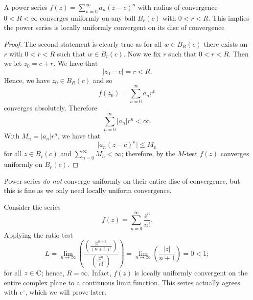 \begin{theorem}[]
    A power series $f(z) = \sum_{n = 0}^\infty a_n (z - c)^n$ with radius of convergence $0 < R < \infty$ converges uniformly on any ball $B_r(c)$ with $0 < r < R$.
    This implies the power series is locally uniformly convergent on its disc of convergence
\end{theorem}

\begin{proof}
    The second statement is clearly true as for all $w \in B_R(c)$ there exists an $r$ with $0 < r < R$ such that $w \in B_r(c)$. 
    Now we fix $r$ such that $0 < r < R$.
    Then we let $z_0 = c + r$.
    We have that 
    \[ \lvert z_0 - c \rvert = r < R. \]
    Hence, we have $z_0 \in B_R(c)$ and so 
    \[ f(z_0) = \sum_{n = 0}^\infty a_nr^n \] 
    converges absolutely.
    Therefore
    \[ \sum_{n = 0}^\infty \lvert a_n \rvert r^n < \infty. \]
    With $M_n = \lvert a_n \rvert r^n$, we have that
    \[ \lvert a_n (z - c)^n \rvert \leq M_n \]
    for all $z \in B_r(c)$ and $\sum_{n = 0}^\infty M_n < \infty$;
    therefore, by the $M$-test $f(z)$ converges uniformly on $B_r(c)$.
\end{proof}

\begin{remark}
    Power series \emph{do not} converge uniformly on their entire disc of convergence, but this is fine as we only need locally uniform convergence.
\end{remark}

\begin{example}
    Consider the series
    \[ f(z) = \sum_{n = 0}^\infty \frac{z^n}{n!}.\]
    Applying the ratio test
    \[ 
        L = \lim_{n \to \infty}
        \left( 
            \frac{\left(\frac{\lvert z^{n + 1} \rvert}{(n + 1)!}\right)}
                 {\left(\frac{\lvert z^n \rvert}{n!}\right)} 
        \right) = 
        \lim_{n \to \infty} 
        \left(
            \frac{\lvert z \rvert}{n + 1}
        \right) = 0 < 1;
    \]
    for all $z \in \mathbb{C}$; hence, $R = \infty$.
    Infact, $f(z)$ is locally uniformly convergent on the entire complex plane to a continuous limit function. 
    This series actually agrees with $e^z$, which we will prove later.
\end{example}
